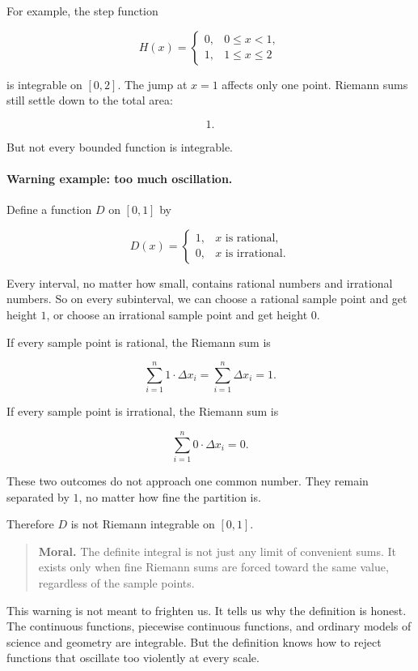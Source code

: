 For example, the step function

\[
H(x)=
\begin{cases}
0, & 0\le x<1,\\
1, & 1\le x\le2
\end{cases}
\]

is integrable on \([0,2]\).  The jump at \(x=1\) affects only one point.  Riemann sums
still settle down to the total area:

\[
1.
\]

But not every bounded function is integrable.

\paragraph{Warning example: too much oscillation.}
Define a function \(D\) on \([0,1]\) by

\[
D(x)=
\begin{cases}
1, & x\text{ is rational},\\
0, & x\text{ is irrational}.
\end{cases}
\]

Every interval, no matter how small, contains rational numbers and irrational numbers.
So on every subinterval, we can choose a rational sample point and get height \(1\), or
choose an irrational sample point and get height \(0\).

If every sample point is rational, the Riemann sum is

\[
\sum_{i=1}^{n}1\cdot \Delta x_i
=
\sum_{i=1}^{n}\Delta x_i
=
1.
\]

If every sample point is irrational, the Riemann sum is

\[
\sum_{i=1}^{n}0\cdot \Delta x_i
=
0.
\]

These two outcomes do not approach one common number.  They remain separated by
\(1\), no matter how fine the partition is.

Therefore \(D\) is not Riemann integrable on \([0,1]\).

\begin{quote}
\textbf{Moral.}
The definite integral is not just any limit of convenient sums.  It exists only when
fine Riemann sums are forced toward the same value, regardless of the sample points.
\end{quote}

This warning is not meant to frighten us.  It tells us why the definition is honest.
The continuous functions, piecewise continuous functions, and ordinary models of
science and geometry are integrable.  But the definition knows how to reject functions
that oscillate too violently at every scale.

